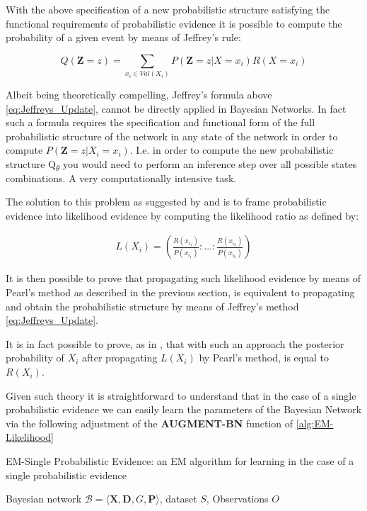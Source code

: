 \documentclass[11pt]{article}
\begin{document}
\begin{article}
With the above specification of a new probabilistic structure
satisfying the functional requirements of probabilistic evidence it
is possible to compute the probability of a given event by means of
Jeffrey's rule:

\begin{equation} \label{eq:Jeffreys_Update}
 Q(\textbf{Z} = z) = \sum_{x_i \in Val(X_i)} P(\textbf{Z} = z | X = x_i) R(X = x_i)
\end{equation}

Albeit being theoretically compelling, Jeffrey's formula above
\ref{eq:Jeffreys_Update}, cannot be directly applied in Bayesian
Networks. In fact such a formula requires the specification and
functional form of the full probabilistic structure of the network
in any state of the network in order to compute \(P(\textbf{Z} = z | X_i =
  x_i)\). I.e. in order to compute the new probabilistic structure
Q\textsubscript{\(\theta\)} you would need to perform an inference step over all
possible states combinations. A very computationally intensive task.

The solution to this problem as suggested by \cite{Chan_2005} and
\cite{PENG_2010} is to frame probabilistic evidence into likelihood
evidence by computing the likelihood ratio as defined by:

\begin{align} \label{eq:probabilistic-to-likelihood-evidence}
 L(X_i) = (\frac{R(x_{i_1})}{P(x_{i_1})}: ... : \frac{R(x_{i_k})}{P(x_{i_k})})
\end{align}

It is then possible to prove that propagating such likelihood
evidence by means of Pearl's method as described in the previous
section, is equivalent to propagating and obtain the probabilistic
structure by means of Jeffrey's method \ref{eq:Jeffreys_Update}.

It is in fact possible to prove, as in \cite{PENG_2010}, that with
such an approach the posterior probability of \(X_i\) after propagating
\(L(X_i)\) by Pearl’s method, is equal to \(R(X_i)\).

Given such theory it is straightforward to understand that
in the case of a single probabilistic evidence we can easily learn
the parameters of the Bayesian Network via the following adjustment
of the \textbf{AUGMENT-BN} function of \ref{alg:EM-Likelihood}

\algrenewcommand\algorithmicindent{1.5em}%

\begin{algorithm*}[h!]
\caption{EM-Single Probabilistic Evidence: an EM algorithm for learning in the case of a single probabilistic evidence}
\label{alg:EM-Probabilistic-Evidence}
\vspace{-10pt}
\begin{multicols}{2}
\begin{algorithmic}[1] 
\Require Bayesian network $\mathcal{B}=\langle \mathbf{X},\mathbf{D}, G, \mathbf{P} \rangle$, dataset $S$, Observations $O$


\end{algorithmic}
\end{multicols}
\end{algorithm*}
\end{article}
\end{document}
